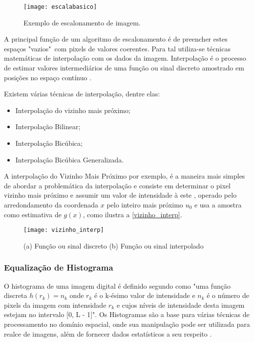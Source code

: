 \begin{figure}[h]
	\centering
	\texttt{[image: escalabasico]}
	\caption{Exemplo de escalonamento de imagem.}
	\label{escalabasico}
\end{figure}

A principal função de um algoritmo de escalonamento é de preencher estes espaços "vazios"\ com pixels de valores coerentes. Para tal utiliza-se técnicas matemáticas de interpolação com os dados da imagem. Interpolação é o processo de estimar valores intermediários de uma função ou sinal discreto amostrado em posições no espaço contínuo \cite{luiz_vizinho}.

Existem várias técnicas de interpolação, dentre elas:

\begin{itemize}
	\item Interpolação do vizinho mais próximo;
	\item Interpolação Bilinear;
	\item Interpolação Bicúbica;
	\item Interpolação Bicúbica Generalizada.
\end{itemize}

A interpolação do Vizinho Mais Próximo por exemplo, é a maneira mais simples de abordar a problemática da interpolação e consiste em determinar o pixel vizinho mais próximo e assumir um valor de intensidade à este \cite{giassa_escalona}, operado pelo arredondamento da coordenada $x$ pelo inteiro mais próximo $u_0$ e usa a amostra como estimativa de $g(x)$, como ilustra a \autoref{vizinho_interp}.

\begin{figure}[h]
	\centering
	\texttt{[image: vizinho\_interp]}
	\caption{(a) Função ou sinal discreto (b) Função ou sinal interpolado }
	\label{vizinho_interp}
\end{figure}


\subsubsection{Equalização de Histograma}\label{subsubsec:equalizacao}

O histograma de uma imagem digital é definido segundo  como "uma função discreta $h(r_k)=n_k$ onde  $r_k$ é o k-ésimo valor de intensidade e $n_k$  é o número de pixels da imagem com intensidade $r_k$ e cujos níveis de intensidade desta imagem estejam no intervalo [0, L - 1]". Os Histogramas são a base para várias técnicas de processamento no domínio espacial, onde sua manipulação pode ser utilizada para realce de imagens, além de fornecer dados estatísticos a seu respeito \cite{gonzalez_woods}.

